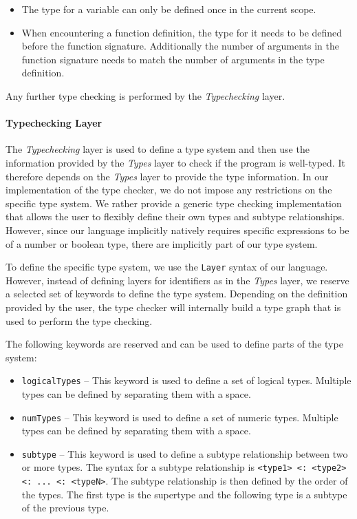 \documentclass[acmsmall, review, screen]{acmart}
\begin{document}
\begin{itemize}
	\item The type for a variable can only be defined once in the current scope.
	\item When encountering a function definition, the type for it needs to be defined before the function signature. Additionally the number of arguments in the function signature needs to match the number of arguments in the type definition.
\end{itemize}

Any further type checking is performed by the \textit{Typechecking} layer.

\paragraph{Typechecking Layer}

The \textit{Typechecking} layer is used to define a type system and then use the information provided by the \textit{Types} layer to check if the program is well-typed. It therefore depends on the \textit{Types} layer to provide the type information. In our implementation of the type checker, we do not impose any restrictions on the specific type system. We rather provide a generic type checking implementation that allows the user to flexibly define their own types and subtype relationships. However, since our language implicitly natively requires specific expressions to be of a number or boolean type, there are implicitly part of our type system.

To define the specific type system, we use the \texttt{Layer} syntax of our language. However, instead of defining layers for identifiers as in the \textit{Types} layer, we reserve a selected set of keywords to define the type system. Depending on the definition provided by the user, the type checker will internally build a type graph that is used to perform the type checking.

The following keywords are reserved and can be used to define parts of the type system:

\begin{itemize}
	\item \texttt{logicalTypes} -- This keyword is used to define a set of logical types. Multiple types can be defined by separating them with a space.
	\item \texttt{numTypes} -- This keyword is used to define a set of numeric types. Multiple types can be defined by separating them with a space.
	\item \texttt{subtype} -- This keyword is used to define a subtype relationship between two or more types. The syntax for a subtype relationship is \texttt{<type1> <: <type2> <: ... <: <typeN>}. The subtype relationship is then defined by the order of the types. The first type is the supertype and the following type is a subtype of the previous type.
\end{itemize}
\end{document}
